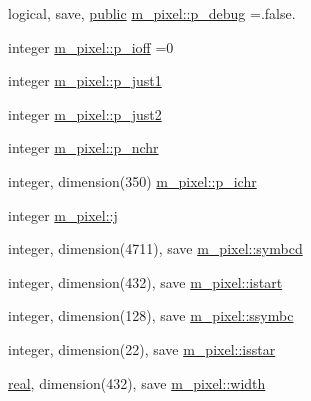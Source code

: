 \begin{DoxyCompactItemize}
\item 
logical, save, \hyperlink{M__stopwatch_83_8txt_a2f74811300c361e53b430611a7d1769f}{public} \hyperlink{namespacem__pixel_aa98d89b6e06aa65bb897ee27901ab8ce}{m\+\_\+pixel\+::p\+\_\+debug} =.false.
\item 
integer \hyperlink{namespacem__pixel_a7dfccfa543f53e4f6bd06a28f963ee69}{m\+\_\+pixel\+::p\+\_\+ioff} =0
\item 
integer \hyperlink{namespacem__pixel_aea6d1d5a4f88e0b07db43e92463bb065}{m\+\_\+pixel\+::p\+\_\+just1}
\item 
integer \hyperlink{namespacem__pixel_a9d00991f1ff7ed891170100d8e9d64f0}{m\+\_\+pixel\+::p\+\_\+just2}
\item 
integer \hyperlink{namespacem__pixel_a70edd7b43b9667a9d304b3028f113cc8}{m\+\_\+pixel\+::p\+\_\+nchr}
\item 
integer, dimension(350) \hyperlink{namespacem__pixel_a34ef1aad7a3aa45df090b226788a2d2c}{m\+\_\+pixel\+::p\+\_\+ichr}
\item 
integer \hyperlink{namespacem__pixel_a1faa00d5ad36016f8c9f4522a2391209}{m\+\_\+pixel\+::j}
\item 
integer, dimension(4711), save \hyperlink{namespacem__pixel_a3da3613bd8dfa6a15b7d0aa3db1f9eb5}{m\+\_\+pixel\+::symbcd}
\item 
integer, dimension(432), save \hyperlink{namespacem__pixel_af41ef8a6b53ec63db42172fab83ecbfa}{m\+\_\+pixel\+::istart}
\item 
integer, dimension(128), save \hyperlink{namespacem__pixel_a2b75d036a498ac0c68380803a0f1d538}{m\+\_\+pixel\+::ssymbc}
\item 
integer, dimension(22), save \hyperlink{namespacem__pixel_a6f8d92e6b4c33e62399d3286448b76fa}{m\+\_\+pixel\+::isstar}
\item 
\hyperlink{read__watch_83_8txt_abdb62bde002f38ef75f810d3a905a823}{real}, dimension(432), save \hyperlink{namespacem__pixel_abf266872f93a04af39d2903fb20d2a0d}{m\+\_\+pixel\+::width}
\end{DoxyCompactItemize}
